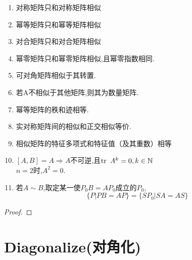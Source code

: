 \documentclass[UTF8,a4paper,notitlepage]{book}
\begin{document}
        \begin{corollary}\begin{enumerate}\mbox{}
            \item 对称矩阵只和对称矩阵相似
            \item 幂等矩阵只和幂等矩阵相似
            \item 对合矩阵只和对合矩阵相似
            \item 幂零矩阵只和幂零矩阵相似,且幂零指数相同.
            \item 可对角矩阵相似于其转置.
            \item 若A不相似于其他矩阵,则其为数量矩阵.
            \item 幂等矩阵的秩和迹相等.
            \item 实对称矩阵间的相似和正交相似等价.
            \item 相似矩阵的特征多项式和特征值（及其重数）相等
            \item $[A,B]=A\Rightarrow A$不可逆,且$\operatorname{tr}~A^k=0,k\in \mathbb{N}$\\ $n=2$时,$A^2=0$.
            \item 若$A\sim B$,取定某一使$P_0B=AP_0$成立的$P_0$,$$\{P|PB=AP\}=\{SP_0|SA=AS\}$$
        \end{enumerate}\end{corollary}
        \begin{proof}
            
        \end{proof}
        \section{Diagonalize(对角化)}
\end{document}
